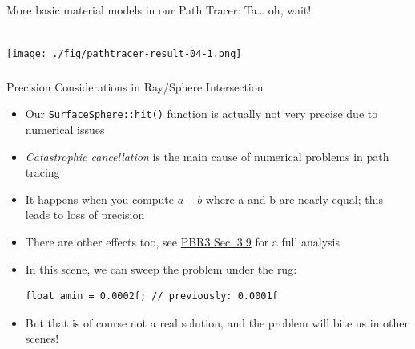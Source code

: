 \documentclass[utf8,stillsansserifmath,fleqn,t]{beamer}
\newcommand{\code}[1]{\texttt{#1}}
\begin{document}
\begin{frame}
\frametitle{\insertsection}
More basic material models in our Path Tracer: Ta\ldots{} oh, wait!\\~\\
\centerline{\texttt{[image: ./fig/pathtracer-result-04-1.png]}}
\end{frame}

\begin{frame}[fragile]
\frametitle{\insertsection}
Precision Considerations in Ray/Sphere Intersection
\begin{itemize}
\item Our \code{SurfaceSphere::hit()} function is actually not very precise due
to numerical issues
\item \emph{Catastrophic cancellation} is the main cause of numerical problems
in path tracing
\item It happens when you compute $a-b$ where a and b are nearly equal; this
leads to loss of precision
\item There are other effects too, see \href{https://www.pbr-book.org/3ed-2018/Shapes/Managing_Rounding_Error}{PBR3 Sec. 3.9} for a full analysis
\item In this scene, we can sweep the problem under the rug:
\begin{lstlisting}
float amin = 0.0002f; // previously: 0.0001f
\end{lstlisting}
\item But that is of course not a real solution, and the problem will bite
us in other scenes!
\end{itemize}
\end{frame}
\end{document}
